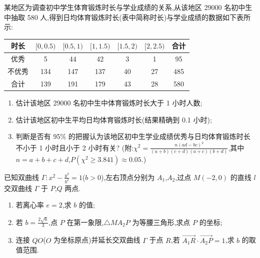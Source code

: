\begin{problem}
某地区为调查初中学生体育锻炼时长与学业成绩的关系,从该地区 29000 名初中生中抽取 580 人,得到日均体育锻炼时长(表中简称时长)与学业成绩的数据如下表所示:

\begin{center}
\begin{tabular}{|c|c|c|c|c|c|c|}
\hline
时长 & \([0,0.5)\) & \([0.5,1)\) & \([1,1.5)\) & \([1.5,2)\) & \([2,2.5)\) & 合计 \\
\hline
优秀 & 5 & 44 & 42 & 3 & 1 & 95 \\
\hline
不优秀 & 134 & 147 & 137 & 40 & 27 & 485 \\
\hline
合计 & 139 & 191 & 179 & 43 & 28 & 580 \\
\hline
\end{tabular}
\end{center}

\begin{enumerate}
\item 估计该地区 29000 名初中生中体育锻炼时长大于 1 小时人数;
\item 估计该地区初中生平均日均体育锻炼时长(结果精确到 0.1 小时);
\item 判断是否有 95\% 的把握认为该地区初中生学业成绩优秀与日均体育锻炼时长不小于 1 小时且小于 2 小时有关?
(附:\(\chi^2=\frac{n(ad-bc)^2}{(a+b)(c+d)(a+c)(b+d)}\),其中 \(n=a+b+c+d\),\(P(\chi^2\ge 3.841)\approx 0.05\).)
\end{enumerate}
\end{problem}

\begin{problem}
已知双曲线 \(\Gamma:x^2-\frac{y^2}{b^2}=1\)(\(b>0\)),左右顶点分别为 \(A_1\),\(A_2\),过点 \(M(-2,0)\) 的直线 \(l\) 交双曲线 \(\Gamma\) 于 \(P\),\(Q\) 两点.

\begin{enumerate}
\item 若离心率 \(e=2\),求 \(b\) 的值;
\item 若 \(b=\frac{2\sqrt{6}}{3}\),点 \(P\) 在第一象限,\(\triangle MA_2P\) 为等腰三角形,求点 \(P\) 的坐标;
\item 连接 \(QO\)(\(O\) 为坐标原点)并延长交双曲线 \(\Gamma\) 于点 \(R\),若 \(\overrightarrow{A_1R}\cdot\overrightarrow{A_2P}=1\),求 \(b\) 的取值范围.
\end{enumerate}
\end{problem}

